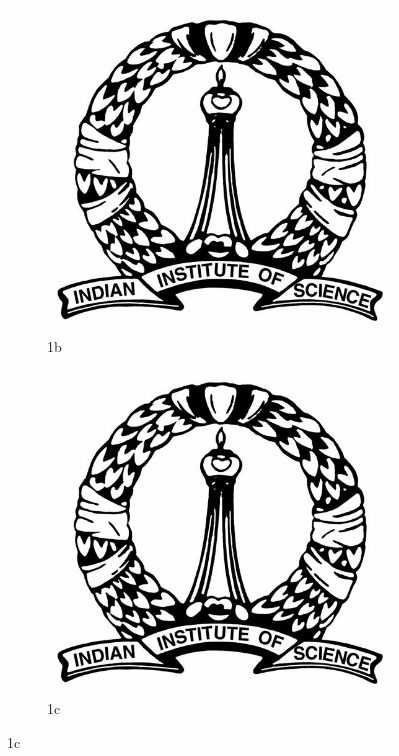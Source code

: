 \documentclass[10pt,a4paper]{article}
\begin{document}
\begin{figure}
    \begin{subfigure}{.30\textwidth}
        \centering
        \includegraphics[width=1.0\linewidth]{IISc_logo.jpg}
        \caption{1b}
        \label{fig:sfig2}
    \end{subfigure}
%
    \begin{subfigure}{.30\textwidth}
        \centering
        \includegraphics[width=1.0\linewidth]{IISc_logo.jpg}
        \caption{1c}
        \label{fig:sfig3}
    \end{subfigure}


\end{figure}
\end{document}
